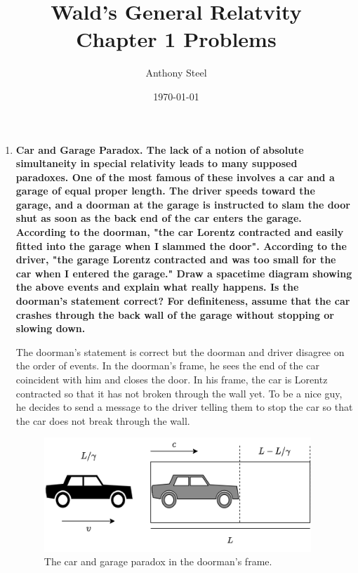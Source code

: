 \documentclass[9pt]{report}
\begin{document}
\title{Wald's General Relatvity \protect\\ Chapter 1 Problems}
\author{Anthony Steel}
\date{\today}
\maketitle
\begin{enumerate}
  \item \textbf{Car and Garage Paradox. The lack of a notion of absolute
      simultaneity in special relativity leads to many supposed paradoxes. One
      of the most famous of these involves a car and a garage of equal proper
      length. The driver speeds toward the garage, and a doorman at the garage
      is instructed to slam the door shut as soon as the back end of the car
      enters the garage. According to the doorman, "the car Lorentz contracted
      and easily fitted into the garage when I slammed the door". According to
      the driver, "the garage Lorentz contracted and was too small for the car
      when I entered the garage." Draw a spacetime diagram showing the above
      events and explain what really happens. Is the doorman's statement
      correct? For definiteness, assume that the car crashes through the
      back wall of the garage without stopping or slowing down.}

      The doorman's statement is correct but the doorman and
      driver disagree on the order of events. In the doorman's frame, he sees
      the end of the car coincident with him and closes the door. In his frame,
      the car is Lorentz contracted so that it has not broken through the wall yet.
      To be a nice guy, he decides to send a message to the driver telling them
      to stop the car so that the car does not break through the wall.

      \begin{figure}
        \includegraphics[width=0.95\textwidth]{images/carandgarageparadox.png}
        \caption{The car and garage paradox in the doorman's frame.}
        \label{doorman}
      \end{figure}


\end{enumerate}
\end{document}
